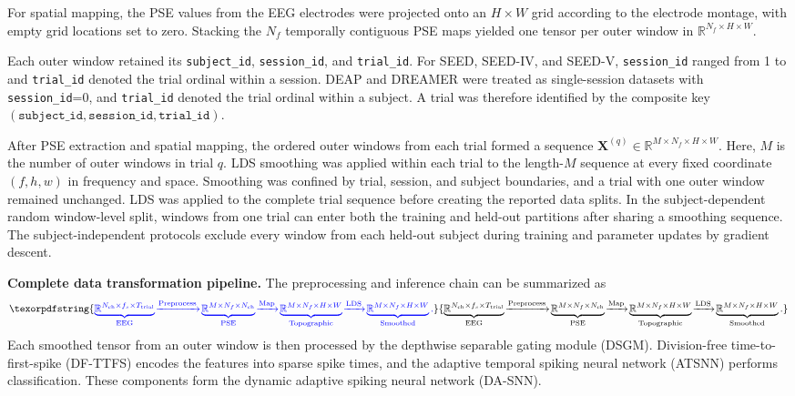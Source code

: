 \documentclass[12pt]{article}
\providecommand{\DIFaddtex}[1]{{\protect\color{blue}\sf #1}}
\providecommand{\DIFadd}[1]{\texorpdfstring{\DIFaddtex{#1}}{#1}}
\providecommand{\DIFaddbegin}{}
\providecommand{\DIFaddend}{}
\begin{document}
For spatial mapping, the PSE values from  \DIFaddbegin \DIFadd{the EEG electrodes were }\DIFaddend projected onto an $H \times W$ grid according to the electrode montage\DIFaddbegin \DIFadd{, with empty grid locations set to zero. Stacking the }\DIFaddend $N_f$  \DIFaddbegin \DIFadd{temporally contiguous PSE maps yielded one tensor per outer window in $\mathbb{R}^{N_f \times H \times W}$.
}

\DIFadd{Each outer window retained its \texttt{subject\_id}, \texttt{session\_id}, and \texttt{trial\_id}. For SEED, SEED-IV, and SEED-V, \texttt{session\_id} ranged from 1 }\DIFaddend to \DIFaddbegin \DIFadd{3 and \texttt{trial\_id} denoted the trial ordinal within a session. DEAP and DREAMER were treated as single-session datasets with \texttt{session\_id}=0, and \texttt{trial\_id} denoted the trial ordinal within a subject. A trial was therefore identified by the composite key $(\texttt{subject\_id},\texttt{session\_id},\texttt{trial\_id})$.
}

\DIFadd{After PSE extraction and spatial mapping, the ordered outer windows from each trial formed a sequence $\mathbf{X}^{(q)} \in \mathbb{R}^{M \times N_f \times H \times W}$. Here, $M$ is the number of outer windows in trial $q$. LDS smoothing was applied within each trial to }\DIFaddend the  \DIFaddbegin \DIFadd{length-$M$ sequence at every fixed coordinate $(f,h,w)$ in frequency and space. Smoothing was confined by trial, session, and subject boundaries, and a trial with one outer window remained unchanged. LDS was applied to the complete trial sequence before creating the reported data splits. In the subject-dependent random window-level split, windows from one trial can enter both the training and held-out partitions after sharing a smoothing sequence. The subject-independent protocols exclude every window from each held-out subject during training and parameter updates by gradient descent.
}\DIFaddend 

 \DIFaddbegin \DIFadd{\textbf{Complete data transformation pipeline.}
The preprocessing and inference chain can be summarized as
}\begin{equation}
\DIFadd{\underbrace{\mathbb{R}^{N_{\mathrm{ch}} \times f_s \times T_{\mathrm{trial}}}}_{\text{EEG}}
\!\xrightarrow{\text{Preprocess}}\!
\underbrace{\mathbb{R}^{M \times N_f \times N_{\mathrm{ch}}}}_{\text{PSE}}
\!\xrightarrow{\text{Map}}\!
\underbrace{\mathbb{R}^{M \times N_f \times H \times W}}_{\text{Topographic}}
\!\xrightarrow{\text{LDS}}\!
\underbrace{\mathbb{R}^{M \times N_f \times H \times W}}_{\text{Smoothed}}.
\label{eq:preprocessing_pipeline}
}\end{equation}
\DIFadd{Each smoothed tensor from an outer window is then processed by the depthwise separable gating module (DSGM). Division-free time-to-first-spike (DF-TTFS) encodes the features into sparse spike times, and the adaptive temporal spiking neural network (ATSNN) performs classification. These components form the dynamic adaptive spiking neural network (DA-SNN).
}\DIFaddend 
\end{document}
